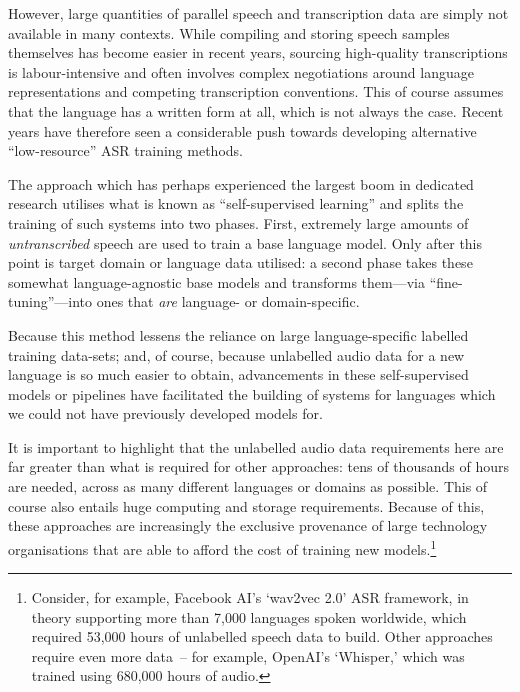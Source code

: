 \documentclass[10pt,twoside,openright]{report}
\begin{document}
However, large quantities of parallel speech and transcription data are simply not available in many contexts.
While compiling and storing speech samples themselves has become easier in recent years, sourcing high-quality transcriptions is labour-intensive and often involves complex negotiations around language representations and competing transcription conventions.
This of course assumes that the language has a written form at all, which is not always the case.
Recent years have therefore seen a considerable push towards developing alternative ``low-resource'' ASR training methods.

The approach which has perhaps experienced the largest boom in dedicated research utilises what is known as ``self-supervised learning'' and splits the training of such systems into two phases.
First, extremely large amounts of \textit{untranscribed} speech are used to train a base language model.
Only after this point is target domain or language data utilised: a second phase takes these somewhat language-agnostic base models and transforms them---via ``fine-tuning''---into ones that \textit{are} language- or domain-specific.

Because this method lessens the reliance on large language-specific labelled training data-sets; and, of course, because unlabelled audio data for a new language is so much easier to obtain, advancements in these self-supervised models or pipelines have facilitated the building of systems for languages which we could not have previously developed models for. 

It is important to highlight that the unlabelled audio data requirements here are far greater than what is required for other approaches: tens of thousands of hours are needed, across as many different languages or domains as possible.
This of course also entails huge computing and storage requirements.
Because of this, these approaches are increasingly the exclusive provenance of large technology organisations that are able to afford the cost of training new models.\footnote{Consider, for example, Facebook AI's `wav2vec 2.0' ASR framework, in theory supporting more than 7,000 languages spoken worldwide, which required 53,000 hours of unlabelled speech data to build.
Other approaches require even more data~-- for example, OpenAI's `Whisper,' which was trained using 680,000 hours of audio.}
\end{document}
